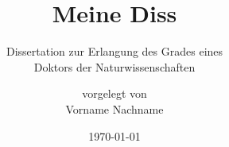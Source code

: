 %
%
%
\recalctypearea
%

%
%
%
\titlehead{
  \vspace{6em}
  \centering
  \texttt{[image: Uniol\_correctColor]}\\
  {%
    \lsstyle{}%
    \selectfont%
      fakultät ii -- informatik, wirtschafts- und rechtswissenschaften\\
      department für informatik%
  }
  \vspace{-4em}
}
%
\title{Meine Diss}
%
\subtitle{%
  \vspace{2em}%
  \normalfont%
  \textsf{%
    Dissertation zur Erlangung des Grades eines\\Doktors der Naturwissenschaften%
  }%
}
%
\author{{\large\textsf{vorgelegt von}}\\\textsf{Vorname Nachname}}
%
\date{\large\textsf{\today}}
%
\maketitle
%

